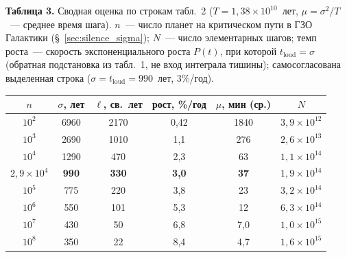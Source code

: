 \documentclass[12pt,a4paper]{article}
\begin{document}
\begin{center}
\textbf{Таблица 3.} Сводная оценка по строкам табл.~2 ($T = 1{,}38 \times 10^{10}$~лет, $\mu = \sigma^2/T$~--- среднее время шага). $n$~--- число планет на критическом пути в ГЗО Галактики (\S~\ref{sec:silence_sigma}); $N$~--- число элементарных шагов; темп роста~--- скорость экспоненциального роста $P(t)$, при которой $t_{\mathrm{loud}}=\sigma$ (обратная подстановка из табл.~1, не вход интеграла тишины); самосогласована выделенная строка ($\sigma=t_{\mathrm{loud}}=990$~лет, $3\%$/год).

\medskip
\small
\begin{tabular}{c c c c c c}
\hline
$n$ & $\sigma$, лет & $\ell$, св.~лет & рост, \%/год & $\mu$, мин (ср.) & $N$ \\
\hline
$10^2$ & 6960 & 2170 & 0{,}42 & 1840 & $3{,}9 \times 10^{12}$ \\
$10^3$ & 2690 & 1010 & 1{,}1 & 276 & $2{,}6 \times 10^{13}$ \\
$10^4$ & 1290 & 470 & 2{,}3 & 63 & $1{,}1 \times 10^{14}$ \\
\textbf{$2{,}9 \times 10^4$} & \textbf{990} & \textbf{330} & \textbf{3{,}0} & \textbf{37} & \textbf{$1{,}9 \times 10^{14}$} \\
$10^5$ & 775 & 220 & 3{,}8 & 23 & $3{,}2 \times 10^{14}$ \\
$10^6$ & 550 & 101 & 5{,}3 & 12 & $6{,}3 \times 10^{14}$ \\
$10^7$ & 430 & 50 & 6{,}8 & 7{,}0 & $1{,}0 \times 10^{15}$ \\
$10^8$ & 350 & 22 & 8{,}4 & 4{,}7 & $1{,}6 \times 10^{15}$ \\
\hline
\end{tabular}
\normalsize
\end{center}
\end{document}
